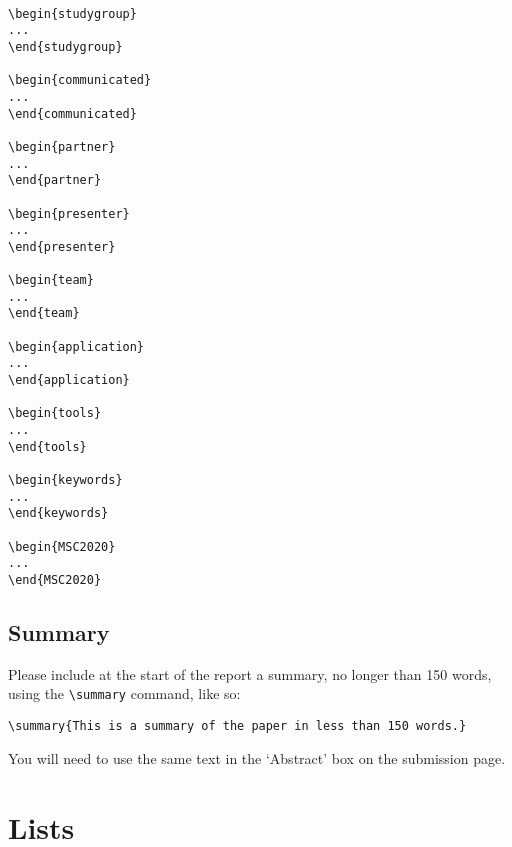 \documentclass{MIIR}
\theoremstyle{plain}
\theoremstyle{definition}
\begin{document}
\begin{verbatim}

\begin{studygroup}
...
\end{studygroup}

\begin{communicated}
...
\end{communicated}

\begin{partner}
...
\end{partner}

\begin{presenter}
...
\end{presenter}

\begin{team}
...
\end{team}

\begin{application}
...
\end{application}

\begin{tools}
...
\end{tools}

\begin{keywords}
...
\end{keywords}

\begin{MSC2020}
...
\end{MSC2020}
\end{verbatim}


\subsection{Summary}\label{abstract}
Please include at the start of the report a summary, no longer than 150 words,
 using the  \verb"\summary" command, like so:

\begin{verbatim}
\summary{This is a summary of the paper in less than 150 words.}
\end{verbatim}

You will need to use the same text in the `Abstract' box on the submission page.


\section{Lists}
\end{document}

